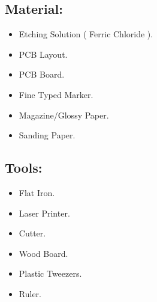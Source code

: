 \subsection{Material:}

\begin{itemize}
\item Etching Solution ( Ferric Chloride ).
\item PCB Layout.
\item PCB Board.
\item Fine Typed Marker.
\item Magazine/Glossy Paper.
\item Sanding Paper.
\end{itemize}

\subsection{Tools:}

\begin{itemize}
\item Flat Iron.
\item Laser Printer.
\item Cutter.
\item Wood Board.
\item Plastic Tweezers.
\item Ruler.
\end{itemize}

\pagebreak